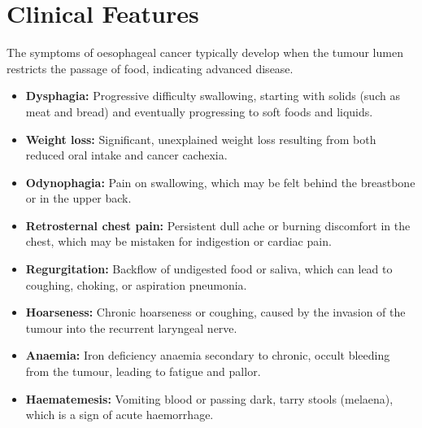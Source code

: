 \section*{Clinical Features}
The symptoms of oesophageal cancer typically develop when the tumour lumen restricts the passage of food, indicating advanced disease.
\begin{itemize}
    \item \textbf{Dysphagia:} Progressive difficulty swallowing, starting with solids (such as meat and bread) and eventually progressing to soft foods and liquids.
    \item \textbf{Weight loss:} Significant, unexplained weight loss resulting from both reduced oral intake and cancer cachexia.
    \item \textbf{Odynophagia:} Pain on swallowing, which may be felt behind the breastbone or in the upper back.
    \item \textbf{Retrosternal chest pain:} Persistent dull ache or burning discomfort in the chest, which may be mistaken for indigestion or cardiac pain.
    \item \textbf{Regurgitation:} Backflow of undigested food or saliva, which can lead to coughing, choking, or aspiration pneumonia.
    \item \textbf{Hoarseness:} Chronic hoarseness or coughing, caused by the invasion of the tumour into the recurrent laryngeal nerve.
    \item \textbf{Anaemia:} Iron deficiency anaemia secondary to chronic, occult bleeding from the tumour, leading to fatigue and pallor.
    \item \textbf{Haematemesis:} Vomiting blood or passing dark, tarry stools (melaena), which is a sign of acute haemorrhage.
\end{itemize}

